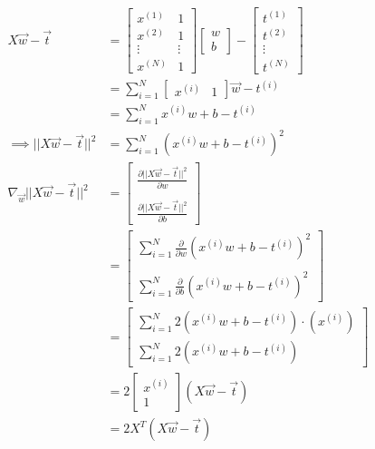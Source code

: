\documentclass{article}
\begin{document}
\subsection{}

\begin{align*}
X\vec{w} - \vec{t} &=  \begin{bmatrix} x^{(1)} & 1 \\ x^{(2)} & 1 \\ \vdots & \vdots \\ x^{(N)} & 1 \end{bmatrix}  \begin{bmatrix} w \\ b \end{bmatrix} -  \begin{bmatrix} t^{(1)} \\ t^{(2)} \\ \vdots \\ t^{(N)} \end{bmatrix} \\
&= \sum_{i=1}^N  \begin{bmatrix} x^{(i)} & 1 \end{bmatrix} \vec{w} - t^{(i)} \\
&= \sum_{i=1}^N  x^{(i)} w + b - t^{(i)} \\
\implies || X\vec{w} - \vec{t} ||^2 &= \sum_{i=1}^N  (x^{(i)} w + b - t^{(i)})^2 \\
\nabla_{\vec{w}}  || X\vec{w} - \vec{t} ||^2 &= \begin{bmatrix} \frac{\partial || X\vec{w} - \vec{t} ||^2}{\partial w} \\ \\ \frac{\partial || X\vec{w} - \vec{t} ||^2}{\partial b} \end{bmatrix} \\
&= \begin{bmatrix} \sum_{i=1}^N  \frac{\partial }{\partial w} (x^{(i)} w + b - t^{(i)})^2 \\ \\  \sum_{i=1}^N  \frac{\partial }{\partial b} (x^{(i)} w + b - t^{(i)})^2 \end{bmatrix} \\
&= \begin{bmatrix} \sum_{i=1}^N  2(x^{(i)} w + b - t^{(i)}) \cdot (x^{(i)}) \\  \sum_{i=1}^N  2(x^{(i)} w + b - t^{(i)}) \end{bmatrix} \\
&= 2  \begin{bmatrix} x^{(i)} \\ 1 \end{bmatrix} ( X \vec{w} - \vec{t} ) \\
&= \boxed{ 2 X^T (X \vec{w} - \vec{t}	)}
\end{align*}
\end{document}
